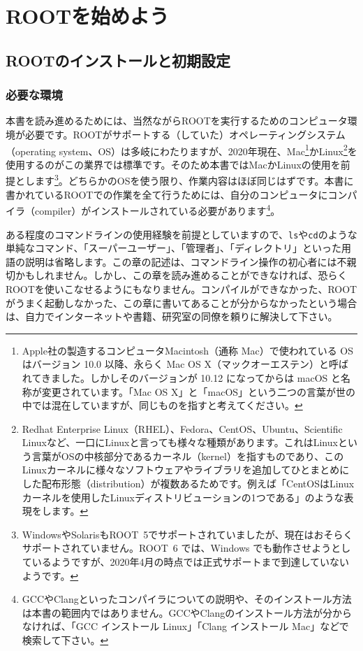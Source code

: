 \chapter{ROOTを始めよう}
\label{chap:Install}
\section{ROOTのインストールと初期設定}
\label{sec:ROOT_install}
\subsection{必要な環境}
本書を読み進めるためには、当然ながらROOTを実行するためのコンピュータ環境が必要です。ROOTがサポートする（していた）オペレーティングシステム（operating system、OS）は多岐にわたりますが、2020年現在、Mac\footnote{Apple社の製造するコンピュータMacintosh（通称 Mac）で使われている OS はバージョン 10.0 以降、永らく Mac OS X（マックオーエステン）と呼ばれてきました。しかしそのバージョンが 10.12 になってからは macOS と名称が変更されています。「Mac OS X」と「macOS」という二つの言葉が世の中では混在していますが、同じものを指すと考えてください。}かLinux\footnote{Redhat Enterprise Linux（RHEL）、Fedora、CentOS、Ubuntu、Scientific Linuxなど、一口にLinuxと言っても様々な種類があります。これはLinuxという言葉がOSの中核部分であるカーネル（kernel）を指すものであり、このLinuxカーネルに様々なソフトウェアやライブラリを追加してひとまとめにした配布形態（distribution）が複数あるためです。例えば「CentOSはLinuxカーネルを使用したLinuxディストリビューションの1つである」のような表現をします。}を使用するのがこの業界では標準です。そのため本書ではMacかLinuxの使用を前提とします\footnote{WindowsやSolarisもROOT~5でサポートされていましたが、現在はおそらくサポートされていません。ROOT~6 では、Windows でも動作させようとしているようですが、2020年4月の時点では正式サポートまで到達していないようです。}。どちらかのOSを使う限り、作業内容はほぼ同じはずです。本書に書かれているROOTでの作業を全て行うためには、自分のコンピュータにコンパイラ（compiler）がインストールされている必要があります\footnote{GCCやClangといったコンパイラについての説明や、そのインストール方法は本書の範囲内ではありません。GCCやClangのインストール方法が分からなければ、「GCC インストール Linux」「Clang インストール Mac」などで検索して下さい。}。

ある程度のコマンドラインの使用経験を前提としていますので、\texttt{ls}や\texttt{cd}のような単純なコマンド、「スーパーユーザー」、「管理者」、「ディレクトリ」といった用語の説明は省略します。この章の記述は、コマンドライン操作の初心者には不親切かもしれません。しかし、この章を読み進めることができなければ、恐らくROOTを使いこなせるようにもなりません。コンパイルができなかった、ROOTがうまく起動しなかった、この章に書いてあることが分からなかったという場合は、自力でインターネットや書籍、研究室の同僚を頼りに解決して下さい。


